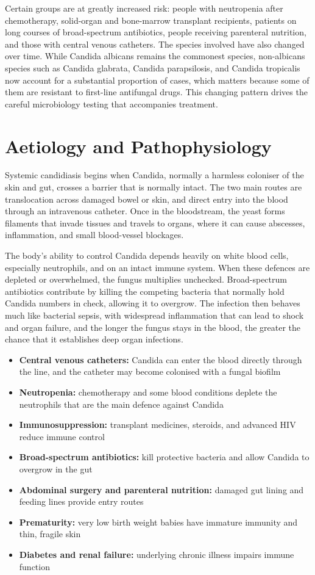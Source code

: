 Certain groups are at greatly increased risk: people with neutropenia after chemotherapy, solid-organ and bone-marrow transplant recipients, patients on long courses of broad-spectrum antibiotics, people receiving parenteral nutrition, and those with central venous catheters. The species involved have also changed over time. While Candida albicans remains the commonest species, non-albicans species such as Candida glabrata, Candida parapsilosis, and Candida tropicalis now account for a substantial proportion of cases, which matters because some of them are resistant to first-line antifungal drugs. This changing pattern drives the careful microbiology testing that accompanies treatment.

\section*{Aetiology and Pathophysiology}
Systemic candidiasis begins when Candida, normally a harmless coloniser of the skin and gut, crosses a barrier that is normally intact. The two main routes are translocation across damaged bowel or skin, and direct entry into the blood through an intravenous catheter. Once in the bloodstream, the yeast forms filaments that invade tissues and travels to organs, where it can cause abscesses, inflammation, and small blood-vessel blockages.

The body's ability to control Candida depends heavily on white blood cells, especially neutrophils, and on an intact immune system. When these defences are depleted or overwhelmed, the fungus multiplies unchecked. Broad-spectrum antibiotics contribute by killing the competing bacteria that normally hold Candida numbers in check, allowing it to overgrow. The infection then behaves much like bacterial sepsis, with widespread inflammation that can lead to shock and organ failure, and the longer the fungus stays in the blood, the greater the chance that it establishes deep organ infections.

\begin{itemize}
    \item \textbf{Central venous catheters:} Candida can enter the blood directly through the line, and the catheter may become colonised with a fungal biofilm
    \item \textbf{Neutropenia:} chemotherapy and some blood conditions deplete the neutrophils that are the main defence against Candida
    \item \textbf{Immunosuppression:} transplant medicines, steroids, and advanced HIV reduce immune control
    \item \textbf{Broad-spectrum antibiotics:} kill protective bacteria and allow Candida to overgrow in the gut
    \item \textbf{Abdominal surgery and parenteral nutrition:} damaged gut lining and feeding lines provide entry routes
    \item \textbf{Prematurity:} very low birth weight babies have immature immunity and thin, fragile skin
    \item \textbf{Diabetes and renal failure:} underlying chronic illness impairs immune function
\end{itemize}


